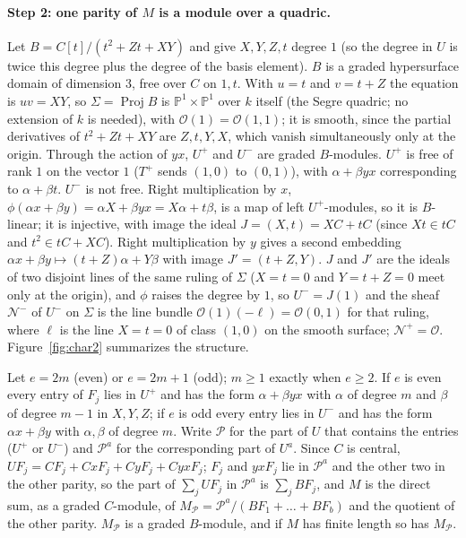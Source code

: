 \documentclass[11pt]{article}
\theoremstyle{definition}
\theoremstyle{remark}
\newcommand{\Proj}{\operatorname{Proj}}
\begin{document}
\paragraph{Step 2: one parity of $M$ is a module over a quadric.} Let $B=C[t]/(t^2+Zt+XY)$ and give $X,Y,Z,t$ degree $1$ (so the degree in $U$ is twice this degree plus the degree of the basis element). $B$ is a graded hypersurface domain of dimension $3$, free over $C$ on $1,t$. With $u=t$ and $v=t+Z$ the equation is $uv=XY$, so $\Sigma=\Proj B$ is $\mathbb P^1\times\mathbb P^1$ over $k$ itself (the Segre quadric; no extension of $k$ is needed), with $\mathcal O(1)=\mathcal O(1,1)$; it is smooth, since the partial derivatives of $t^2+Zt+XY$ are $Z,t,Y,X$, which vanish simultaneously only at the origin. Through the action of $yx$, $U^+$ and $U^-$ are graded $B$-modules. $U^+$ is free of rank $1$ on the vector $1$ ($T^+$ sends $(1,0)$ to $(0,1)$), with $\alpha+\beta yx$ corresponding to $\alpha+\beta t$. $U^-$ is not free. Right multiplication by $x$, $\phi(\alpha x+\beta y)=\alpha X+\beta yx=X\alpha+t\beta$, is a map of left $U^+$-modules, so it is $B$-linear; it is injective, with image the ideal $J=(X,t)=XC+tC$ (since $Xt\in tC$ and $t^2\in tC+XC$). Right multiplication by $y$ gives a second embedding $\alpha x+\beta y\mapsto(t+Z)\alpha+Y\beta$ with image $J'=(t+Z,Y)$. $J$ and $J'$ are the ideals of two disjoint lines of the same ruling of $\Sigma$ ($X=t=0$ and $Y=t+Z=0$ meet only at the origin), and $\phi$ raises the degree by $1$, so $U^-=J(1)$ and the sheaf $\mathcal N^-$ of $U^-$ on $\Sigma$ is the line bundle $\mathcal O(1)(-\ell)=\mathcal O(0,1)$ for that ruling, where $\ell$ is the line $X=t=0$ of class $(1,0)$ on the smooth surface; $\mathcal N^+=\mathcal O$. Figure~\ref{fig:char2} summarizes the structure.

Let $e=2m$ (even) or $e=2m+1$ (odd); $m\ge1$ exactly when $e\ge2$. If $e$ is even every entry of $F_j$ lies in $U^+$ and has the form $\alpha+\beta yx$ with $\alpha$ of degree $m$ and $\beta$ of degree $m-1$ in $X,Y,Z$; if $e$ is odd every entry lies in $U^-$ and has the form $\alpha x+\beta y$ with $\alpha,\beta$ of degree $m$. Write $\mathcal P$ for the part of $U$ that contains the entries ($U^+$ or $U^-$) and $\mathcal P^a$ for the corresponding part of $U^a$. Since $C$ is central, $UF_j=CF_j+CxF_j+CyF_j+CyxF_j$; $F_j$ and $yxF_j$ lie in $\mathcal P^a$ and the other two in the other parity, so the part of $\sum_jUF_j$ in $\mathcal P^a$ is $\sum_jBF_j$, and $M$ is the direct sum, as a graded $C$-module, of $M_{\mathcal P}=\mathcal P^a/(BF_1+\dots+BF_b)$ and the quotient of the other parity. $M_{\mathcal P}$ is a graded $B$-module, and if $M$ has finite length so has $M_{\mathcal P}$.
\end{document}
